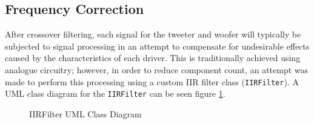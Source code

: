 \documentclass[main.tex]{subfiles}
\begin{document}
\subsection{Frequency Correction}
After crossover filtering, each signal for the tweeter and woofer will typically be subjected to signal processing in an attempt to compensate for undesirable effects caused by the characteristics of each driver.
This is traditionally achieved using analogue circuitry; however, in order to reduce component count, an attempt was made to perform this processing using a custom IIR filter class (\lstinline{IIRFilter}).
A UML class diagram for the \lstinline{IIRFilter} can be seen figure \ref{fig:iir-uml}.

\begin{figure}[H]
    \centering
    \caption{IIRFilter UML Class Diagram}
    \label{fig:iir-uml}
\end{figure}
\end{document}
